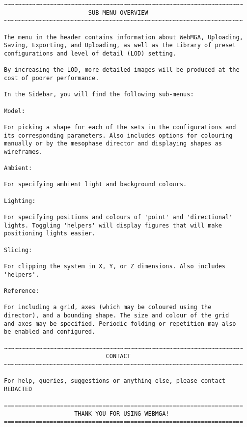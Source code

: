\begin{lstlisting}
~~~~~~~~~~~~~~~~~~~~~~~~~~~~~~~~~~~~~~~~~~~~~~~~~~~~~~~~~~~~~~~~~~~~
                        SUB-MENU OVERVIEW
~~~~~~~~~~~~~~~~~~~~~~~~~~~~~~~~~~~~~~~~~~~~~~~~~~~~~~~~~~~~~~~~~~~~

The menu in the header contains information about WebMGA, Uploading,
Saving, Exporting, and Uploading, as well as the Library of preset
configurations and level of detail (LOD) setting.

By increasing the LOD, more detailed images will be produced at the
cost of poorer performance.

In the Sidebar, you will find the following sub-menus:

Model:

For picking a shape for each of the sets in the configurations and
its corresponding parameters. Also includes options for colouring
manually or by the mesophase director and displaying shapes as
wireframes.

Ambient:

For specifying ambient light and background colours.

Lighting:

For specifying positions and colours of 'point' and 'directional'
lights. Toggling 'helpers' will display figures that will make
positioning lights easier.

Slicing:

For clipping the system in X, Y, or Z dimensions. Also includes
'helpers'.

Reference:

For including a grid, axes (which may be coloured using the
director), and a bounding shape. The size and colour of the grid
and axes may be specified. Periodic folding or repetition may also
be enabled and configured.

~~~~~~~~~~~~~~~~~~~~~~~~~~~~~~~~~~~~~~~~~~~~~~~~~~~~~~~~~~~~~~~~~~~~
                             CONTACT
~~~~~~~~~~~~~~~~~~~~~~~~~~~~~~~~~~~~~~~~~~~~~~~~~~~~~~~~~~~~~~~~~~~~

For help, queries, suggestions or anything else, please contact
REDACTED

====================================================================
                    THANK YOU FOR USING WEBMGA!
====================================================================
\end{lstlisting}

